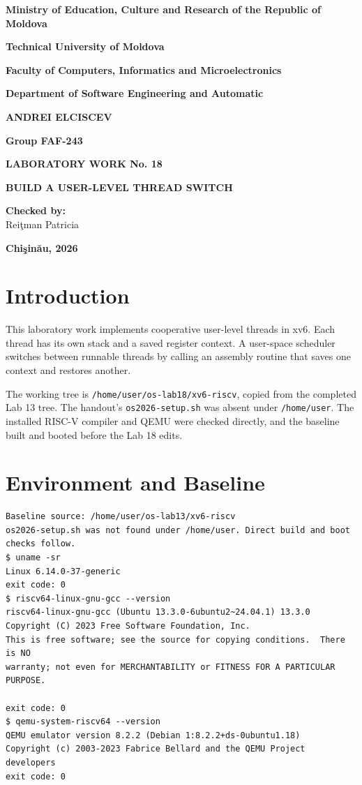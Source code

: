 \documentclass[12pt,a4paper]{article}
\begin{document}
\begin{titlepage}
\centering
\textbf{Ministry of Education, Culture and Research of the Republic of Moldova}\par\medskip
\textbf{Technical University of Moldova}\par\medskip
\textbf{Faculty of Computers, Informatics and Microelectronics}\par\medskip
\textbf{Department of Software Engineering and Automatic}\par
\vspace{2.5cm}
\textbf{ANDREI ELCISCEV}\par
\textbf{Group FAF-243}\par
\vspace{2cm}
{\Large\textbf{LABORATORY WORK No. 18}\par}
\medskip
{\Large\textbf{BUILD A USER-LEVEL THREAD SWITCH}\par}
\vspace{2cm}
\begin{flushright}
\textbf{Checked by:}\\
Rei\c{t}man Patricia
\end{flushright}
\vfill
\textbf{Chi\c{s}in\u{a}u, 2026}
\end{titlepage}
\tableofcontents
\newpage
\section{Introduction}
This laboratory work implements cooperative user-level threads in xv6. Each
thread has its own stack and a saved register context. A user-space scheduler
switches between runnable threads by calling an assembly routine that saves one
context and restores another.

The working tree is \texttt{/home/user/os-lab18/xv6-riscv}, copied from the
completed Lab 13 tree. The handout's \texttt{os2026-setup.sh} was absent under
\texttt{/home/user}. The installed RISC-V compiler and QEMU were checked directly,
and the baseline built and booted before the Lab 18 edits.

\section{Environment and Baseline}

\begin{lstlisting}[caption={Baseline and installed toolchain}]
Baseline source: /home/user/os-lab13/xv6-riscv
os2026-setup.sh was not found under /home/user. Direct build and boot checks follow.
$ uname -sr
Linux 6.14.0-37-generic
exit code: 0
$ riscv64-linux-gnu-gcc --version
riscv64-linux-gnu-gcc (Ubuntu 13.3.0-6ubuntu2~24.04.1) 13.3.0
Copyright (C) 2023 Free Software Foundation, Inc.
This is free software; see the source for copying conditions.  There is NO
warranty; not even for MERCHANTABILITY or FITNESS FOR A PARTICULAR PURPOSE.

exit code: 0
$ qemu-system-riscv64 --version
QEMU emulator version 8.2.2 (Debian 1:8.2.2+ds-0ubuntu1.18)
Copyright (c) 2003-2023 Fabrice Bellard and the QEMU Project developers
exit code: 0
\end{lstlisting}
\end{document}
